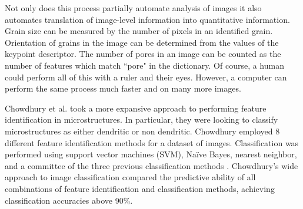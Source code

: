 Not only does this process partially automate analysis of images it also automates translation of image-level information into quantitative information. Grain size can be measured by the number of pixels in an identified grain. Orientation of grains in the image can be determined from the values of the keypoint descriptor. The number of pores in an image can be counted as the number of features which match ``pore" in the dictionary. Of course, a human could perform all of this with a ruler and their eyes. However, a computer can perform the same process much faster and on many more images. 

Chowdhury et al. took a more expansive approach to performing feature identification in microstructures. In particular, they were looking to classify microstructures as either dendritic or non dendritic. Chowdhury employed 8 different feature identification methods for a dataset of images. Classification was performed using support vector machines (SVM), Na\"ive Bayes, nearest neighbor, and a committee of the three previous classification methods \cite{Chowdhury2016}. Chowdhury's wide approach to image classification compared the predictive ability of all combinations of feature identification and classification methods, achieving classification accuracies above 90\%. 